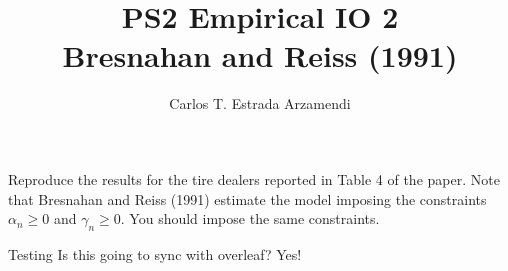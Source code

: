 \documentclass[12pt]{article}
\title{\vspace{-2cm}\textbf{PS2 Empirical IO 2}\\
Bresnahan and Reiss (1991)}
\author{Carlos T. Estrada Arzamendi}
\begin{document}
\maketitle

\section{}
Reproduce the results for the tire dealers reported in Table 4 of the paper. Note that
Bresnahan and Reiss (1991) estimate the model imposing the constraints $\alpha_n \geq 0$  and
$\gamma_n \geq 0$. You should impose the same constraints.

Testing Is this going to sync with overleaf? Yes!
\end{document}
